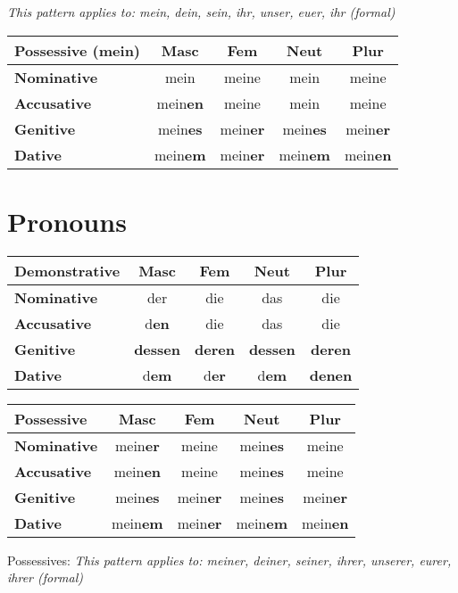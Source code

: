 \documentclass[a4paper,20pt]{article}
\newcommand{\grammarending}[1]{\textbf{\textcolor{endingcolor}{#1}}}
\begin{document}
\textit{This pattern applies to: mein, dein, sein, ihr, unser, euer, ihr (formal)}

\begin{center}
\begin{tabular}{|l|c|c|c|c|}
\hline
\textbf{Possessive (mein)} & \textbf{Masc} & \textbf{Fem} & \textbf{Neut} & \textbf{Plur} \\
\hline
\textbf{Nominative} & mein & meine & mein & meine \\
\hline
\textbf{Accusative} & mein\grammarending{en} & meine & mein & meine \\
\hline
\textbf{Genitive} & mein\grammarending{es} & mein\grammarending{er} & mein\grammarending{es} & mein\grammarending{er} \\
\hline
\textbf{Dative} & mein\grammarending{em} & mein\grammarending{er} & mein\grammarending{em} & mein\grammarending{en} \\
\hline
\end{tabular}
\end{center}

\section{Pronouns}

\begin{multicols}{2}
\noindent
\begin{tabular}{|l|c|c|c|c|}
\hline
\textbf{Demonstrative} & \textbf{Masc} & \textbf{Fem} & \textbf{Neut} & \textbf{Plur} \\
\hline
\textbf{Nominative} & der & die & das & die \\
\hline
\textbf{Accusative} & d\grammarending{en} & die & das & die \\
\hline
\textbf{Genitive} & \grammarending{dessen} & \grammarending{deren} & \grammarending{dessen} & \grammarending{deren} \\
\hline
\textbf{Dative} & d\grammarending{em} & d\grammarending{er} & d\grammarending{em} & \grammarending{denen} \\
\hline
\end{tabular}

\begin{tabular}{|l|c|c|c|c|}
\hline
\textbf{Possessive} & \textbf{Masc} & \textbf{Fem} & \textbf{Neut} & \textbf{Plur} \\
\hline
\textbf{Nominative} & mein\grammarending{er} & meine & mein\grammarending{es} & meine \\
\hline
\textbf{Accusative} & mein\grammarending{en} & meine & mein\grammarending{es} & meine \\
\hline
\textbf{Genitive} & mein\grammarending{es} & mein\grammarending{er} & mein\grammarending{es} & mein\grammarending{er} \\
\hline
\textbf{Dative} & mein\grammarending{em} & mein\grammarending{er} & mein\grammarending{em} & mein\grammarending{en} \\
\hline
\end{tabular}
\end{multicols}
Possessives: \textit{This pattern applies to: meiner, deiner, seiner, ihrer, unserer, eurer, ihrer (formal)}
\end{document}
